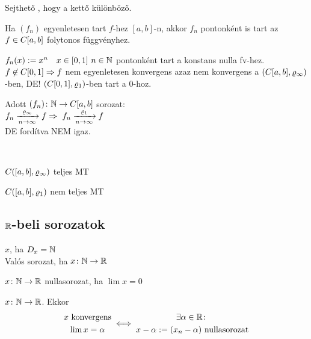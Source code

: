 \begin{megj}
  Sejthető , hogy  a kettő különböző.
\end{megj}
\begin{te}
  Ha  $(f_n)$ egyenletesen tart $f$-hez $[a,b]$-n, akkor $f_n$
  pontonként is tart az \\$f\in C[a,b]$ folytonos függvényhez.
\end{te}
\begin{pl}
  $f_n(x) := x^n\quad x\in[0,1]\ n\in \mathbb{N}$
  pontonként tart a konstans nulla fv-hez. $f\not\in C[0,1] \Rightarrow f$
  nem egyenletesen konvergens azaz nem konvergens a
  $(C[a,b],\varrho_\infty)$-ben, DE! $(C[0,1],\varrho_1)$-ben tart a 0-hoz.
\end{pl}

\begin{te}
  Adott $(f_n)\colon \mathbb{N}\to C[a,b]$ sorozat:\\
  $f_n\xrightarrow[n\n\infty]{\ro_\infty} f\nn\ f_n
  \xrightarrow[n\n\infty]{\ro_1} f$\\
  DE fordítva NEM igaz.
\end{te}

\begin{te}\ 
  \begin{enumzjb}
  \item $C([a,b],\varrho_\infty)$ teljes MT\\
  \item $C([a,b],\varrho_1)$ nem teljes MT
  \end{enumzjb}
\end{te}

\subsection{$\mathbb{R}$-beli sorozatok}
\begin{de}[Sorozat] $x$, ha $D_x=\mathbb{N}$\\
  Valós sorozat, ha $x\colon\mathbb{N}\to\mathbb{R}$
\end{de}

\begin{de}[Nullasorozat]$x\colon \mathbb{N}\to\mathbb{R}$ nullasorozat, ha $\lim x=0$
\end{de}

\begin{te}$x\colon \mathbb{N}\to\mathbb{R}$. Ekkor
\[\begin{gathered}x\text{ konvergens}\\\lim x=\alpha\end{gathered}\iff
\begin{gathered}\exists\alpha\in\mathbb{R}\colon\\x-\alpha:=(x_n-\alpha) \text{ nullasorozat}\end{gathered}\]
\end{te}

